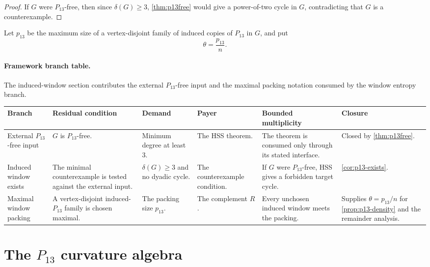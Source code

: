 \documentclass[11pt]{article}
\newtheorem{corollary}[theorem]{Corollary}
\newcommand{\FrameworkBranchTableHeader}{%
\toprule
\textbf{Branch} & \textbf{Residual condition} & \textbf{Demand} & \textbf{Payer} & \textbf{Bounded multiplicity} & \textbf{Closure}\\
\midrule
}
\begin{document}

\begin{proof}
If $G$ were $P_{13}$-free, then since $\delta(G)\ge3$, \cref{thm:p13free} would give a power-of-two cycle in $G$, contradicting that $G$ is a counterexample.
\end{proof}

Let $p_{13}$ be the maximum size of a vertex-disjoint family of induced copies of $P_{13}$ in $G$, and put
\[
\theta=\frac{p_{13}}{n}.
\]

\paragraph{Framework branch table.}
The induced-window section contributes the external \(P_{13}\)-free input and
the maximal packing notation consumed by the window entropy branch.
\begin{longtable}{L{0.13\textwidth} L{0.19\textwidth} L{0.14\textwidth} L{0.14\textwidth} L{0.17\textwidth} L{0.17\textwidth}}
\FrameworkBranchTableHeader
External \(P_{13}\)-free input
&
\(G\) is \(P_{13}\)-free.
&
Minimum degree at least \(3\).
&
The HSS theorem.
&
The theorem is consumed only through its stated interface.
&
Closed by \cref{thm:p13free}.
\\
\addlinespace
Induced window exists
&
The minimal counterexample is tested against the external input.
&
\(\delta(G)\ge3\) and no dyadic cycle.
&
The counterexample condition.
&
If \(G\) were \(P_{13}\)-free, HSS gives a forbidden target cycle.
&
\cref{cor:p13-exists}.
\\
\addlinespace
Maximal window packing
&
A vertex-disjoint induced-\(P_{13}\) family is chosen maximal.
&
The packing size \(p_{13}\).
&
The complement \(R\).
&
Every unchosen induced window meets the packing.
&
Supplies \(\theta=p_{13}/n\) for \cref{prop:p13-density} and the remainder analysis.
\\
\bottomrule
\end{longtable}

\section{The \texorpdfstring{$P_{13}$}{P13} curvature algebra}
\end{document}

